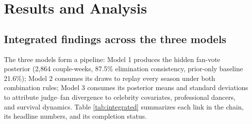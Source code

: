 \section{Results and Analysis}\label{sec:results}

\subsection{Integrated findings across the three models}

The three models form a pipeline: Model 1 produces the hidden fan-vote posterior
(2{,}864 couple-weeks, 87.5\% elimination consistency, prior-only baseline 21.6\%);
Model 2 consumes its draws to replay every season under both combination rules; Model 3
consumes its posterior means and standard deviations to attribute judge--fan divergence
to celebrity covariates, professional dancers, and survival dynamics. Table
\ref{tab:integrated} summarizes each link in the chain, its headline numbers, and its
completion status.

